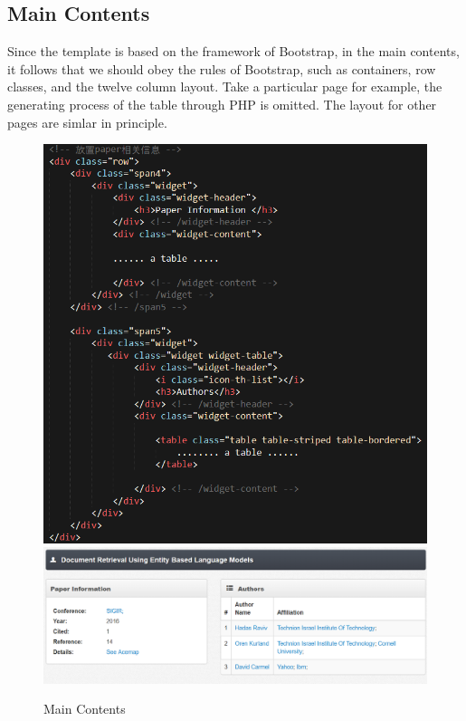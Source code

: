 \documentclass{book}
\begin{document}
\subsection {Main Contents}

Since the template is based on the framework of Bootstrap, in the main contents, it follows that we should obey the rules of Bootstrap, such as containers, row classes, and the twelve column layout. Take a particular page for example, the generating process of the table through PHP is omitted. The layout for other pages are simlar in principle.
\begin{figure}[H]
\centering{}
\includegraphics[scale=0.35]{img/zlt_beau_cont1.png}
\includegraphics[scale=0.35]{img/zlt_beau_cont2.png}
\caption{Main Contents}
\end{figure}
\end{document}
